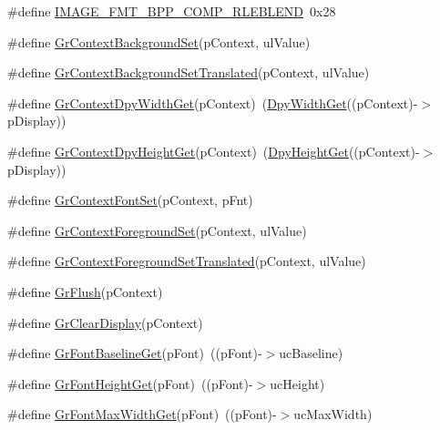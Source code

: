 \begin{DoxyCompactItemize}
\item 
\#define \hyperlink{group__primitives__api_ga3291de932ba18a02b1a92e2293f58809}{I\+M\+A\+G\+E\+\_\+\+F\+M\+T\+\_\+B\+P\+P\+\_\+\+C\+O\+M\+P\+\_\+\+R\+L\+E\+B\+L\+E\+N\+D}~0x28
\item 
\#define \hyperlink{group__primitives__api_gadcfe86bdefc0584e12d4ac9daf3d67e9}{Gr\+Context\+Background\+Set}(p\+Context,  ul\+Value)
\item 
\#define \hyperlink{group__primitives__api_gaf175706737ae73c86509ea2aef9106f9}{Gr\+Context\+Background\+Set\+Translated}(p\+Context,  ul\+Value)
\item 
\#define \hyperlink{group__primitives__api_ga1219ebc4661136115edbf5c5c6f24a44}{Gr\+Context\+Dpy\+Width\+Get}(p\+Context)~(\hyperlink{group__primitives__api_ga0a967ef53683123dc57ff3b6ed096289}{Dpy\+Width\+Get}((p\+Context)-\/$>$p\+Display))
\item 
\#define \hyperlink{group__primitives__api_gad4bd9f3f67afa6df74563bfed243a494}{Gr\+Context\+Dpy\+Height\+Get}(p\+Context)~(\hyperlink{group__primitives__api_ga541c63fcce8846a3f5cdb2d125f437d5}{Dpy\+Height\+Get}((p\+Context)-\/$>$p\+Display))
\item 
\#define \hyperlink{group__primitives__api_gadb0ccdf8e4d23475a4da5b218009edf3}{Gr\+Context\+Font\+Set}(p\+Context,  p\+Fnt)
\item 
\#define \hyperlink{group__primitives__api_ga0f2c64b797d0d085e39eb81a1b8f051c}{Gr\+Context\+Foreground\+Set}(p\+Context,  ul\+Value)
\item 
\#define \hyperlink{group__primitives__api_ga1de81823ccd63e4b3b9fe9087fba8bad}{Gr\+Context\+Foreground\+Set\+Translated}(p\+Context,  ul\+Value)
\item 
\#define \hyperlink{group__primitives__api_ga7be821658be3466ae9aad2176d5d28bf}{Gr\+Flush}(p\+Context)
\item 
\#define \hyperlink{group__primitives__api_gaa7d8c930f467174862c62ea7d7965389}{Gr\+Clear\+Display}(p\+Context)
\item 
\#define \hyperlink{group__primitives__api_gac2b082feb5f30948dbbc06edabc5cdcf}{Gr\+Font\+Baseline\+Get}(p\+Font)~((p\+Font)-\/$>$uc\+Baseline)
\item 
\#define \hyperlink{group__primitives__api_gabf5ee1d9a55f4b4e5afea07eb0a160b0}{Gr\+Font\+Height\+Get}(p\+Font)~((p\+Font)-\/$>$uc\+Height)
\item 
\#define \hyperlink{group__primitives__api_ga776450fb4470ee3c6679549d4f9772e3}{Gr\+Font\+Max\+Width\+Get}(p\+Font)~((p\+Font)-\/$>$uc\+Max\+Width)
\item 

\end{DoxyCompactItemize}
